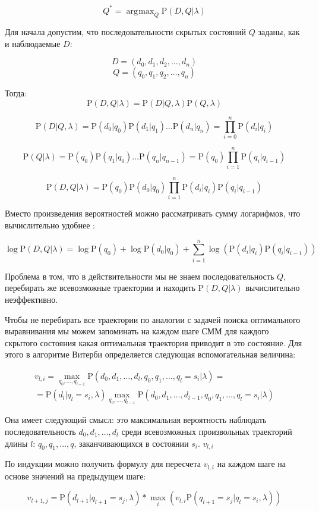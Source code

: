 \documentclass[letterpaper, 11pt]{article}
\newcommand{\prob}{\mathrm{P}}
\DeclareMathOperator*{\argmax}{\arg\!\max}
\begin{document}
$$Q^*=\argmax_Q \prob(D,Q|\lambda)$$

Для начала допустим, что последовательности скрытых состояний $Q$ заданы, как и наблюдаемые $D$:

$$D=(d_0,d_1,d_2,\ldots,d_n)$$
$$Q=(q_0,q_1,q_2,\ldots,q_n)$$

Тогда:
$$\prob(D,Q|\lambda)=\prob(D|Q,\lambda)\prob(Q,\lambda)$$

$$\prob(D|Q,\lambda)=\prob(d_0|q_0)\prob(d_1|q_1)\ldots\prob(d_n|q_n)=\prod_{i=0}^n\prob(d_i|q_i)$$

$$\prob(Q|\lambda)=\prob(q_0)\prob(q_1|q_0)\ldots\prob(q_n|q_{n-1})=\prob(q_0)\prod_{i=1}^n\prob(q_i|q_{i-1})$$

$$\prob(D,Q|\lambda)=\prob(q_0)\prob(d_0|q_0)\prod_{i=1}^n\prob(d_i|q_i)\prob(q_i|q_{i-1})$$

Вместо произведения вероятностей можно рассматривать сумму логарифмов, что вычислительно удобнее :

$$\log\prob(D,Q|\lambda)=\log\prob(q_0)+\log\prob(d_0|q_0) + \sum_{i=1}^n\log(\prob(d_i|q_i)\prob(q_i|q_{i-1}))$$

Проблема в том, что в действительности мы не знаем последовательность $Q$, перебирать же всевозможные траектории и находить $\prob(D,Q|\lambda)$ вычислительно неэффективно.

Чтобы не перебирать все траектории по аналогии с задачей поиска оптимального выравнивания мы можем запоминать на каждом шаге СММ для каждого скрытого состояния какая оптимальная траектория приводит в это состояние. Для этого в алгоритме Витерби определяется следующая вспомогательная величина:

\begin{gather}
v_{l,i}=\max_{q_0,\ldots,q_{l-1}}\prob(d_0,d_1,\ldots,d_l,q_0,q_1,\ldots,q_l=s_i|\lambda)=\\=
\prob(d_{l}|q_{l}=s_i,\lambda) \max_{q_0,\ldots,q_{l-1}}\prob(d_0,d_1,\ldots,d_{l-1},q_0,q_1,\ldots,q_l=s_i|\lambda)
\end{gather}

Она имеет следующий смысл: это максимальная вероятность наблюдать последовательность $d_0,d_1,\ldots,d_l$ среди всевозможных произвольных траекторий длины $l$: $q_0,q_1,\ldots,q$, заканчивающихся в состоянии $s_i$.
$v_{l,i}$

По индукции можно получить формулу для пересчета $v_{l,i}$ на каждом шаге на основе значений на предыдущем шаге:

$$v_{l+1,j}=\prob(d_{l+1}|q_{l+1}=s_j,\lambda)*\max_i(v_{l,i}\prob(q_{l+1}=s_j|q_{l}=s_i,\lambda))$$
\end{document}
